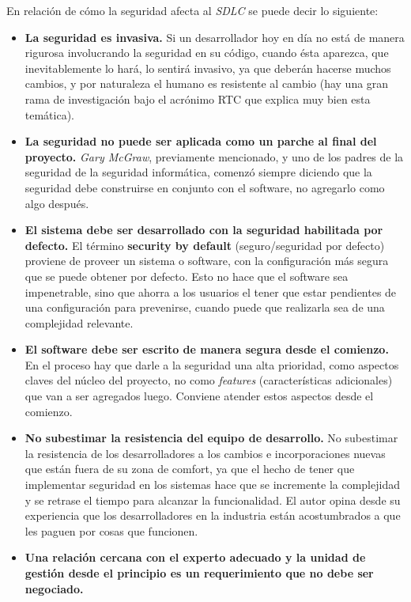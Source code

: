 En relación de cómo la seguridad afecta al \textit{SDLC} se puede decir lo siguiente\cite{GaryMcGrawSoftwareSecurity}\cite{TheSDLCMicrosoft}\cite{SoftwarePenetrationTesting}\cite{Manicode:SSDLC}:
\begin{itemize}
\item \textbf{La seguridad es invasiva.} \newline Si un desarrollador hoy en día no está de manera rigurosa involucrando la seguridad en su código, cuando ésta aparezca, que inevitablemente lo hará, lo sentirá invasivo, ya que deberán hacerse muchos cambios, y por naturaleza el humano es resistente al cambio (hay una gran rama de investigación bajo el acrónimo RTC que explica muy bien esta temática).
\item \textbf{La seguridad no puede ser aplicada como un parche al final del proyecto.} \newline \textit{Gary McGraw}, previamente mencionado, y uno de los padres de la seguridad de la seguridad informática, comenzó siempre diciendo que la seguridad debe construirse en conjunto con el software, no agregarlo como algo después.
\item \textbf{El sistema debe ser desarrollado con la seguridad habilitada por defecto.} \newline El término \textbf{security by default} (seguro/seguridad por defecto) proviene de proveer un sistema o software, con la configuración más segura que se puede obtener por defecto. Esto no hace que el software sea impenetrable, sino que ahorra a los usuarios el tener que estar pendientes de una configuración para prevenirse, cuando puede que realizarla sea de una complejidad relevante.
\item \textbf{El software debe ser escrito de manera segura desde el comienzo.} \newline En el proceso hay que darle a la seguridad una alta prioridad, como aspectos claves del núcleo del proyecto, no como \textit{features} (características adicionales) que van a ser agregados luego. Conviene atender estos aspectos desde el comienzo. 
\item \textbf{No subestimar la resistencia del equipo de desarrollo.} \newline No subestimar la resistencia de los desarrolladores a los cambios e incorporaciones nuevas que están fuera de su zona de comfort, ya que el hecho de tener que implementar seguridad en los sistemas hace que se incremente la complejidad y se retrase el tiempo para alcanzar la funcionalidad. El autor opina desde su experiencia que los desarrolladores en la industria están acostumbrados a que les paguen por cosas que funcionen.
\item \textbf{Una relación cercana con el experto adecuado y la unidad de gestión desde el principio es un requerimiento que no debe ser negociado.}
\end{itemize}
\bigskip

